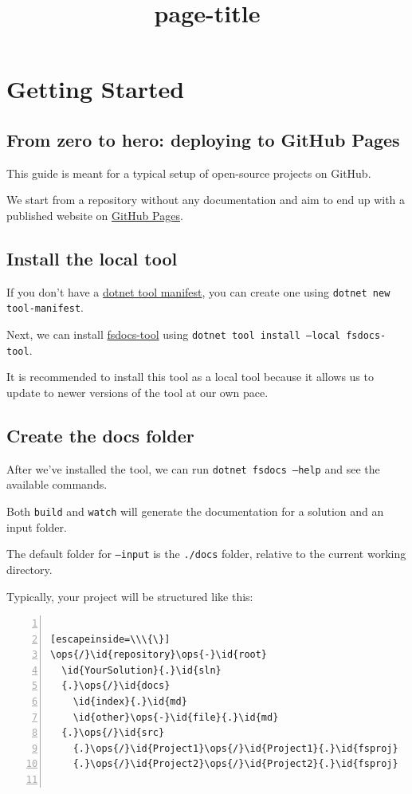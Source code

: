\documentclass{article}
\title{{page-title}}
\date{}
\newcommand{\id}[1]{\textcolor{black}{#1}}
\newcommand{\ops}[1]{\textcolor{purple}{#1}}
\begin{document}
\maketitle


\section*{Getting Started}

\subsection*{From zero to hero: deploying to GitHub Pages}



This guide is meant for a typical setup of open-source projects on GitHub.

We start from a repository without any documentation and aim to end up with a published website on \href{https://pages.github.com/}{GitHub Pages}.
\subsection*{Install the local tool}



If you don't have a \href{https://learn.microsoft.com/en-us/dotnet/core/tools/local-tools-how-to-use\#create-a-manifest-file}{dotnet tool manifest}, you can create one using \texttt{dotnet new tool-manifest}.


Next, we can install \href{https://www.nuget.org/packages/fsdocs-tool/}{fsdocs-tool} using \texttt{dotnet tool install --local fsdocs-tool}.

It is recommended to install this tool as a local tool because it allows us to update to newer versions of the tool at our own pace.
\subsection*{Create the docs folder}



After we've installed the tool, we can run \texttt{dotnet fsdocs --help} and see the available commands.

Both \texttt{build} and \texttt{watch} will generate the documentation for a solution and an input folder.

The default folder for \texttt{--input} is the \texttt{./docs} folder, relative to the current working directory.


Typically, your project will be structured like this:
\begin{lstlisting}[numbers=left]

[escapeinside=\\\{\}]
\ops{/}\id{repository}\ops{-}\id{root}
  \id{YourSolution}{.}\id{sln}
  {.}\ops{/}\id{docs}
    \id{index}{.}\id{md}
    \id{other}\ops{-}\id{file}{.}\id{md}
  {.}\ops{/}\id{src}
    {.}\ops{/}\id{Project1}\ops{/}\id{Project1}{.}\id{fsproj}
    {.}\ops{/}\id{Project2}\ops{/}\id{Project2}{.}\id{fsproj}


\end{lstlisting}
\end{document}

